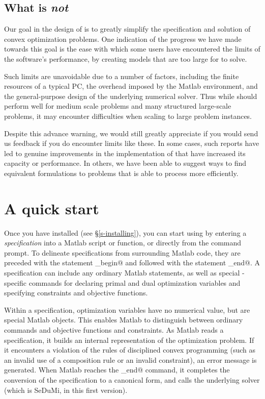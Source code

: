 \documentclass[12pt]{article}
\begin{document}
\subsection{What \cvx is \emph{not}}

Our goal in the design of \cvx is to greatly simplify the 
specification and
solution of convex optimization problems. 
One indication of the progress we have made
towards this goal is the ease with which some users 
have encountered the limits
of the software's performance, by creating models that are too 
large for \cvx to solve.

Such limits are unavoidable due to a number of factors, including
the finite
resources of a typical PC, the overhead imposed by the Matlab 
environment,
and the general-purpose design of the underlying numerical solver.
Thus while \cvx should perform
well for medium scale problems and many structured large-scale 
problems, it may
encounter difficulties when scaling to large problem instances.

Despite this advance warning, 
we would still greatly appreciate if you would send
us feedback if you do encounter limits like these.
In some cases, such reports have led to genuine improvements in the
implementation of \cvx that have
increased its capacity or performance. 
In others, we have been able to suggest
ways to find equivalent formulations to problems that 
\cvx is able to process more efficiently.

\section{A quick start}
\label{sec:quickstart}

Once you have installed \cvx (see \S\ref{s-installing}), you can
start using \cvx by entering a \cvx \emph{specification} into a
Matlab script or function, or directly from the command prompt.
To delineate \cvx specifications from surrounding Matlab code,
they are preceded with the statement
\verb@cvx_begin@ and followed with the statement
\verb@cvx_end@. A specification can
include any ordinary Matlab statements, as well as
special \cvx-specific commands for declaring primal and dual 
optimization variables and specifying constraints and
objective functions.

Within a \cvx specification, optimization variables have no numerical
value, but are special Matlab objects.   
This enables Matlab to distinguish
between ordinary commands and \cvx objective
functions and constraints. As Matlab reads a \cvx specification,
it builds an internal representation of the
optimization problem. If it encounters a
violation of the rules of disciplined convex programming
(such as an invalid use of a composition rule or an invalid
constraint), an error message is generated.
When Matlab reaches 
the \verb@cvx_end@ command, it completes the conversion of
the \cvx specification to a canonical form,
and calls the underlying solver 
(which is SeDuMi, in this first version).
\end{document}
